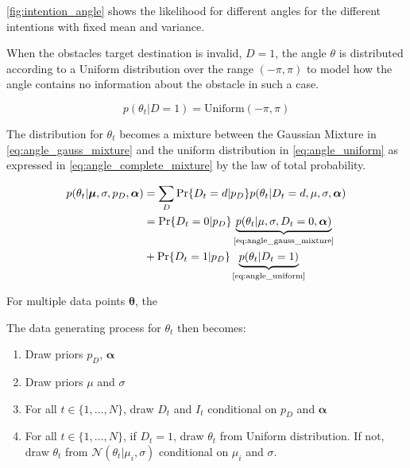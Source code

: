 \cref{fig:intention_angle} shows the likelihood for different angles for the different intentions with fixed mean and variance. 

When the obstacles target destination is invalid, $D=1$, the angle $\theta$ is distributed according to a Uniform distribution over the range $(-\pi, \pi)$ to model how the angle contains no information about the obstacle in such a case. 

\begin{equation}\label{eq:angle_uniform}
    p(\theta_t | D=1) = \text{Uniform}(-\pi, \pi)
\end{equation}

The distribution for $\theta_t$ becomes a mixture between the Gaussian Mixture in \cref{eq:angle_gauss_mixture} and the uniform distribution in  \cref{eq:angle_uniform} as expressed in \cref{eq:angle_complete_mixture} by the law of total probability.

\begin{align}\label{eq:angle_complete_mixture}
\begin{split}
     p(\theta_t | \boldsymbol{\mu}, \sigma, p_D, \boldsymbol{\alpha})
     &= \sum_D \Pr\{D_t=d | p_D\} p(\theta_t | D_t=d, \mu, \sigma, \boldsymbol{\alpha})\\
     &= \Pr\{D_t = 0 | p_D\} \underbrace{p(\theta_t | \mu, \sigma, D_t=0, \boldsymbol{\alpha})}_{\text{\cref{eq:angle_gauss_mixture}}}\\
     &+ \Pr\{D_t=1 | p_D\}\underbrace{p(\theta_t | D_t=1)}_{\text{\cref{eq:angle_uniform}}}
\end{split}
\end{align}

For multiple data points $\boldsymbol{\theta}$, the


The data generating process for $\theta_t$ then becomes:

\begin{enumerate}
    \item Draw priors $p_D$, $\boldsymbol{\alpha}$ 
    \item Draw priors $\mu$ and $\sigma$
    \item For all $t \in \{1, \dots, N \}$, draw $D_t$ and $I_t$ conditional on $p_D$ and $\boldsymbol{\alpha}$
    \item For all $t \in \{1, \dots, N\} $, if $D_t=1$, draw $\theta_t$ from Uniform distribution. If not, draw $\theta_t$ from $\mathcal{N}(\theta_t | \mu_i, \sigma)$ conditional on $\mu_i$ and $\sigma$. 
\end{enumerate}


